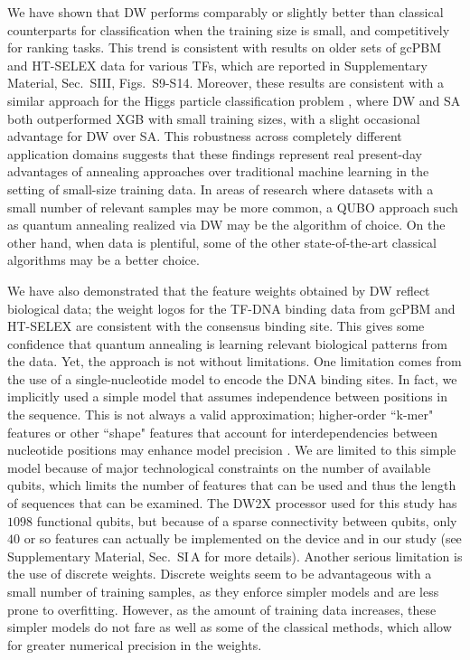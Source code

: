\documentclass[aps,pra,groupedaddress,nofootinbib,notitlepage,showpacs,floatfix,superscriptaddress]{revtex4-1}
\begin{document}
We have shown that DW performs comparably or slightly better than classical counterparts for classification when the training size is small, and competitively for ranking tasks.  {This trend is consistent with results on older sets of gcPBM and HT-SELEX data for various TFs, which are reported in Supplementary Material, Sec.~SIII, Figs.~S9-S14.} Moreover, these results are consistent with a similar approach for the Higgs particle classification problem \cite{Mott:2017aa}, where DW and SA both outperformed XGB with small training sizes, with a slight occasional advantage for DW over SA. This robustness across completely different application domains suggests that these findings represent real present-day advantages of annealing approaches over traditional machine learning in the setting of small-size training data. In areas of research where datasets with a small number of relevant samples may be more common, a QUBO approach such as quantum annealing realized via DW may be the algorithm of choice. On the other hand, when data is plentiful, some of the other state-of-the-art classical algorithms may be a better choice. 

We have also demonstrated that the feature weights obtained by DW reflect biological data; the weight logos for the TF-DNA binding data from gcPBM and HT-SELEX are consistent with the consensus binding site. This gives some confidence that quantum annealing is learning relevant biological patterns from the data. Yet, the approach is not without limitations. One limitation comes from the use of a single-nucleotide model to encode the DNA binding sites. In fact, we implicitly used a simple model that assumes independence between positions in the sequence. This is not always a valid approximation; higher-order ``k-mer" features or other ``shape" features that account for interdependencies between nucleotide positions may enhance model precision \cite{Mordelet:13,Zhou:13,Yang:14,Zhou:15,Yang:17}. We are limited to this simple model because of major technological constraints on the number of available qubits, which limits the number of features that can be used and thus the length of sequences that can be examined. The DW2X processor used for this study has $1098$ functional qubits, but because of a sparse connectivity between qubits, only $40$ or so features can actually be implemented on the device and in our study (see Supplementary Material, Sec.~SI\,A for more details). {Another serious limitation is the use of discrete weights. Discrete weights seem to be advantageous with a small number of training samples, as they enforce simpler models and are less prone to overfitting. However, as the amount of training data increases, these simpler models do not fare as well as some of the classical methods, which allow for greater numerical precision in the weights.}
\end{document}
